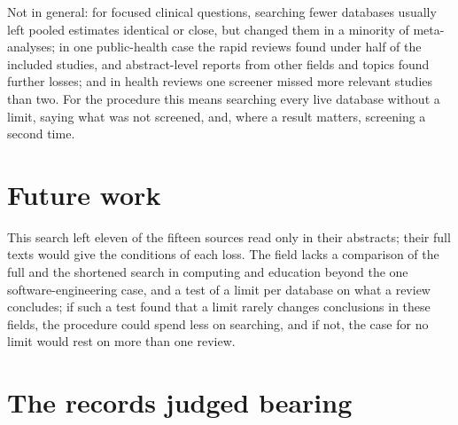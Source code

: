 Not in general: for focused clinical questions, searching fewer
databases usually left pooled estimates identical or close, but changed
them in a minority of meta-analyses; in one public-health case the rapid
reviews found under half of the included studies, and abstract-level
reports from other fields and topics found further losses; and in health
reviews one screener missed more relevant studies than two.
For the procedure this means searching every live database without a
limit, saying what was not screened, and, where a result matters,
screening a second time.

\section{Future work}
\label{sec:abbreviated-future}

This search left eleven of the fifteen sources read only in their
abstracts; their full texts would give the conditions of each loss.
The field lacks a comparison of the full and the shortened search in
computing and education beyond the one software-engineering case, and a
test of a limit per database on what a review concludes; if such a test
found that a limit rarely changes conclusions in these fields, the
procedure could spend less on searching, and if not, the case for no
limit would rest on more than one review.

\section{The records judged bearing}
\label{sec:abbreviated-hits}


